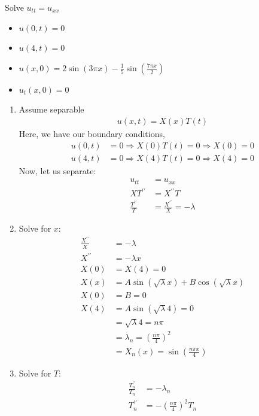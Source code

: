 \documentclass{article}
\begin{document}
\ex Solve $u_{tt} = u_{xx}$
\begin{itemize}
  \item $u(0, t)   = 0 $
  \item $u(4, t)   = 0 $
  \item $u(x, 0)   = 2 \sin(3 \pi x) - \frac{1}{5} \sin\left( \frac{7 \pi x}{2} \right)$
  \item $u_t(x, 0) = 0$
\end{itemize}
\begin{enumerate}
  \item Assume separable
  \begin{align}
    u(x, t) = X(x)T(t)
  \end{align}
  Here, we have our boundary conditions,
  \begin{align}
    u(0, t) & = 0 \Rightarrow X(0)T(t) = 0 \Rightarrow X(0) = 0\\
    u(4, t) & = 0 \Rightarrow X(4)T(t) = 0 \Rightarrow X(4) = 0
  \end{align}
  Now, let us separate:
  \begin{align}
    u_{tt} & = u_{xx}\\
    XT^{\prime\prime} & = X^{\prime\prime}T\\
    \frac{T^{\prime\prime}}{T} & = \frac{X^{\prime\prime}}{X} = -\lambda
  \end{align}
  \item Solve for $x$:
  \begin{align}
    \frac{X^{\prime\prime}}{X} & = - \lambda\\
    X^{\prime\prime} & = -\lambda x\\
    X(0) & = X(4) = 0\\
    X(x) & = A \sin(\sqrt \lambda x) + B \cos (\sqrt \lambda x)\\
    X(0) & = B = 0\\
    X(4) & = A \sin(\sqrt \lambda 4) = 0\\
    & = \sqrt \lambda 4 = n \pi\\
    & = \lambda_n = \left( \frac{n \pi}{4} \right)^2\\
    & = X_n(x) = \sin\left( \frac{n \pi x}{4}\right)
  \end{align}
  \item Solve for $T$:
  \begin{align}
    \frac{T^{\prime\prime}_n}{T_n} & = - \lambda_n\\
    T^{\prime\prime}_n & = - \left( \frac{n \pi}{4} \right)^2 T_n
  \end{align}

\end{enumerate}
\end{document}
